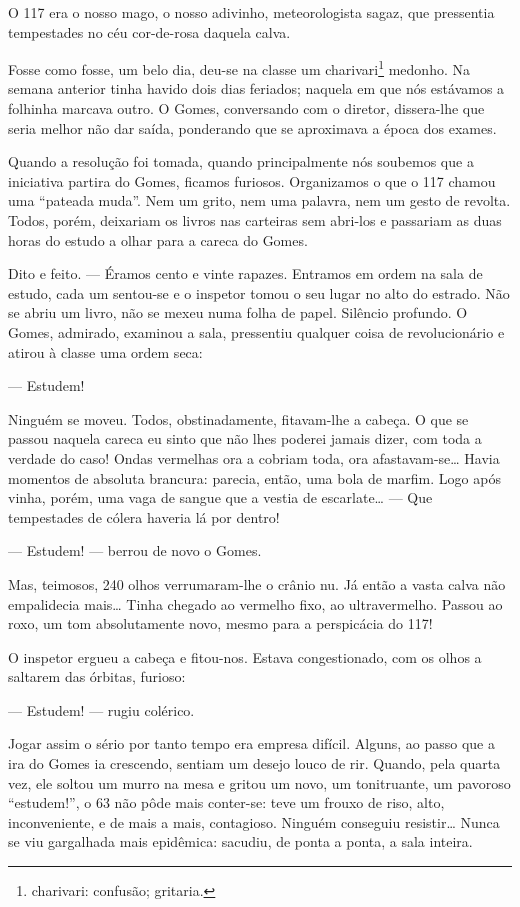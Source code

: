 O 117 era o nosso mago, o nosso adivinho, meteorologista sagaz, que
pressentia tempestades no céu cor-de-rosa daquela calva.

Fosse como fosse, um belo dia, deu-se na classe um charivari\footnote{charivari:
  confusão; gritaria.} medonho. Na semana anterior tinha havido dois
dias feriados; naquela em que nós estávamos a folhinha marcava outro. O
Gomes, conversando com o diretor, dissera-lhe que seria melhor não dar
saída, ponderando que se aproximava a época dos exames.

Quando a resolução foi tomada, quando principalmente nós soubemos que a
iniciativa partira do Gomes, ficamos furiosos. Organizamos o que o 117
chamou uma ``pateada muda''. Nem um grito, nem uma palavra, nem um gesto
de revolta. Todos, porém, deixariam os livros nas carteiras sem abri-los
e passariam as duas horas do estudo a olhar para a careca do Gomes.

Dito e feito. --- Éramos cento e vinte rapazes. Entramos em ordem na
sala de estudo, cada um sentou-se e o inspetor tomou o seu lugar no alto
do estrado. Não se abriu um livro, não se mexeu numa folha de papel.
Silêncio profundo. O Gomes, admirado, examinou a sala, pressentiu
qualquer coisa de revolucionário e atirou à classe uma ordem seca:

--- Estudem!

Ninguém se moveu. Todos, obstinadamente, fitavam-lhe a cabeça. O que se
passou naquela careca eu sinto que não lhes poderei jamais dizer, com
toda a verdade do caso! Ondas vermelhas ora a cobriam toda, ora
afastavam-se\ldots{} Havia momentos de absoluta brancura: parecia, então, uma
bola de marfim. Logo após vinha, porém, uma vaga de sangue que a vestia
de escarlate\ldots{} --- Que tempestades de cólera haveria lá por dentro!

--- Estudem! --- berrou de novo o Gomes.

Mas, teimosos, 240 olhos verrumaram-lhe o crânio nu. Já então a vasta
calva não empalidecia mais\ldots{} Tinha chegado ao vermelho fixo, ao
ultravermelho. Passou ao roxo, um tom absolutamente novo, mesmo para a
perspicácia do 117!

O inspetor ergueu a cabeça e fitou-nos. Estava congestionado, com os
olhos a saltarem das órbitas, furioso:

--- Estudem! --- rugiu colérico.

Jogar assim o sério por tanto tempo era empresa difícil. Alguns, ao
passo que a ira do Gomes ia crescendo, sentiam um desejo louco de rir.
Quando, pela quarta vez, ele soltou um murro na mesa e gritou um novo,
um tonitruante, um pavoroso ``estudem!'', o 63 não pôde mais conter-se:
teve um frouxo de riso, alto, inconveniente, e de mais a mais,
contagioso. Ninguém conseguiu resistir\ldots{} Nunca se viu gargalhada mais
epidêmica: sacudiu, de ponta a ponta, a sala inteira.

